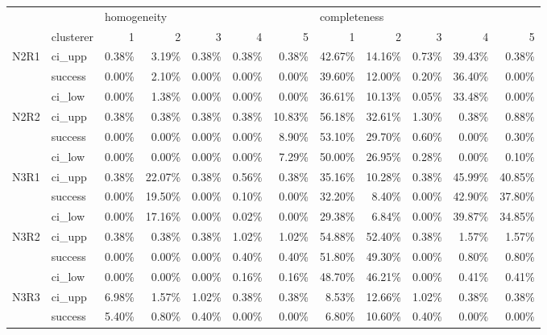 \begin{tabular}{llrrrrrrrrrr}
\toprule
     & {} & \multicolumn{5}{l}{homogeneity} & \multicolumn{5}{l}{completeness} \\
     & clusterer &           1 &      2 &      3 &      4 &      5 &            1 &      2 &     3 &      4 &      5 \\
\midrule
N2R1 & ci\_upp &       0.38\% &  3.19\% &  0.38\% &  0.38\% &  0.38\% &       42.67\% & 14.16\% & 0.73\% & 39.43\% &  0.38\% \\
     & success &       0.00\% &  2.10\% &  0.00\% &  0.00\% &  0.00\% &       39.60\% & 12.00\% & 0.20\% & 36.40\% &  0.00\% \\
     & ci\_low &       0.00\% &  1.38\% &  0.00\% &  0.00\% &  0.00\% &       36.61\% & 10.13\% & 0.05\% & 33.48\% &  0.00\% \\
N2R2 & ci\_upp &       0.38\% &  0.38\% &  0.38\% &  0.38\% & 10.83\% &       56.18\% & 32.61\% & 1.30\% &  0.38\% &  0.88\% \\
     & success &       0.00\% &  0.00\% &  0.00\% &  0.00\% &  8.90\% &       53.10\% & 29.70\% & 0.60\% &  0.00\% &  0.30\% \\
     & ci\_low &       0.00\% &  0.00\% &  0.00\% &  0.00\% &  7.29\% &       50.00\% & 26.95\% & 0.28\% &  0.00\% &  0.10\% \\
N3R1 & ci\_upp &       0.38\% & 22.07\% &  0.38\% &  0.56\% &  0.38\% &       35.16\% & 10.28\% & 0.38\% & 45.99\% & 40.85\% \\
     & success &       0.00\% & 19.50\% &  0.00\% &  0.10\% &  0.00\% &       32.20\% &  8.40\% & 0.00\% & 42.90\% & 37.80\% \\
     & ci\_low &       0.00\% & 17.16\% &  0.00\% &  0.02\% &  0.00\% &       29.38\% &  6.84\% & 0.00\% & 39.87\% & 34.85\% \\
N3R2 & ci\_upp &       0.38\% &  0.38\% &  0.38\% &  1.02\% &  1.02\% &       54.88\% & 52.40\% & 0.38\% &  1.57\% &  1.57\% \\
     & success &       0.00\% &  0.00\% &  0.00\% &  0.40\% &  0.40\% &       51.80\% & 49.30\% & 0.00\% &  0.80\% &  0.80\% \\
     & ci\_low &       0.00\% &  0.00\% &  0.00\% &  0.16\% &  0.16\% &       48.70\% & 46.21\% & 0.00\% &  0.41\% &  0.41\% \\
N3R3 & ci\_upp &       6.98\% &  1.57\% &  1.02\% &  0.38\% &  0.38\% &        8.53\% & 12.66\% & 1.02\% &  0.38\% &  0.38\% \\
     & success &       5.40\% &  0.80\% &  0.40\% &  0.00\% &  0.00\% &        6.80\% & 10.60\% & 0.40\% &  0.00\% &  0.00\% \\

\end{tabular}
